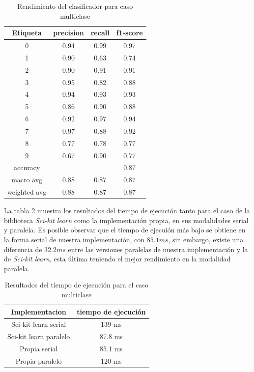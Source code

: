 \documentclass[runningheads]{llncs}
\begin{document}
\begin{table}[h]
    \centering
    \begin{tabular}{|c|c|c|c|}
    \hline
    Etiqueta & precision & recall & f1-score \\
    \hline
    0 & 0.94 & 0.99 & 0.97 \\     
    1 &  0.90 & 0.63 & 0.74 \\    
    2 &  0.90 & 0.91 & 0.91 \\    
    3 &  0.95 & 0.82 & 0.88 \\    
    4 &  0.94 & 0.93 & 0.93 \\
    5 &  0.86 & 0.90 & 0.88 \\
    6 &  0.92 & 0.97 & 0.94 \\   
    7 &  0.97 & 0.88 & 0.92 \\    
    8 &  0.77 & 0.78 & 0.77 \\    
    9 &  0.67 & 0.90 & 0.77 \\    
    \hline
    accuracy & & & 0.87 \\
    macro avg &  0.88 & 0.87 & 0.87 \\
    weighted avg &  0.88 & 0.87 & 0.87 \\
    \hline
    \end{tabular}
    \caption{Rendimiento del clasificador para caso multiclase}
    \label{tab:numberClass}
\end{table}

La tabla \ref{tab:numberTime} muestra los resultados del tiempo de ejecución tanto para el caso de la biblioteca \textit{Sci-kit learn} como la implementación propia, en sus modalidades serial y paralela. Es posible observar que el tiempo de ejecuión más bajo se obtiene en la forma serial de nuestra implementación, con $85.1 ms$, sin embargo, existe una diferencia de $32.2 ms$ entre las versiones paralelas de nuestra implementación y la de \textit{Sci-kit learn}, esta última teniendo el mejor rendimiento en la modalidad paralela.

\begin{table}[h]
    \centering
    \begin{tabular}{|c|c|}
    \hline
    Implementacion & tiempo de ejecución \\
    \hline
    Sci-kit learn serial & 139 ms\\
    Sci-kit learn paralelo & 87.8 ms\\
    Propia serial & 85.1 ms \\
    Propia paralelo & 120 ms\\
    \hline
    \end{tabular}
    \caption{Resultados del tiempo de ejecución para el caso multiclase}
    \label{tab:numberTime}
\end{table}
\end{document}
